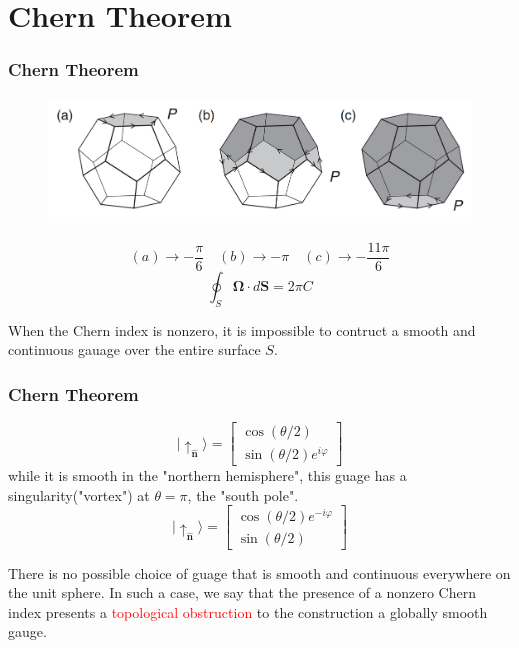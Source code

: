 \documentclass{beamer}
\begin{document}
\section{Chern Theorem}
\begin{frame}
\frametitle{Chern Theorem}
\begin{figure}
\centering
\includegraphics[scale=0.5]{pic/p2.png}
\end{figure}
$$
(a)\rightarrow-\frac{\pi}{6}\quad (b)\rightarrow-\pi\quad (c)\rightarrow-\frac{11\pi}{6}
$$
\begin{equation}
\oint_S\mathbf{\Omega}\cdot d\mathbf{S}=2\pi C
\end{equation}
\begin{block}{}
When the Chern index is nonzero, it is impossible to contruct a smooth and continuous gauage over the entire surface $S$.
\end{block}
\end{frame}
\begin{frame}
\frametitle{Chern Theorem}
\begin{equation}
|\uparrow_{\hat{\mathbf{n}}}\rangle=\left[
\begin{array}{c}
\cos(\theta/2)\\
\sin(\theta/2)e^{i\varphi}
\end{array}
\right]
\end{equation}
while it is smooth in the "northern hemisphere", this guage has a singularity("vortex") at $\theta=\pi$, the  "south pole".
\begin{equation}
|\uparrow_{\hat{\mathbf{n}}}\rangle=\left[
\begin{array}{c}
\cos(\theta/2)e^{-i\varphi}\\
\sin(\theta/2)
\end{array}
\right]
\end{equation}
\begin{block}{}
There is no possible choice of guage that is smooth and continuous everywhere on the unit sphere. In such a case, we say that the presence of a nonzero Chern index presents a \textcolor{red}{topological obstruction}  to the construction a globally smooth gauge.
\end{block}
\end{frame}
\end{document}
